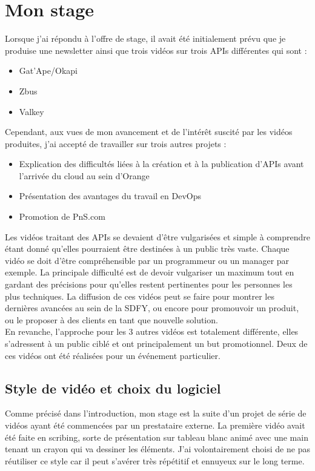\chapter{Mon stage}
\label{sec:unchapitre}

Lorsque j'ai répondu à l'offre de stage, il avait été initialement prévu que je produise une newsletter ainsi que trois vidéos sur trois APIs différentes qui sont :

\begin{itemize}
    \item Gat'Ape/Okapi
    \item Zbus
    \item Valkey
\end{itemize}

Cependant, aux vues de mon avancement et de l'intérêt suscité par les vidéos produites, j'ai accepté de travailler sur trois autres projets :

\begin{itemize}
    \item Explication des difficultés liées à la création et à la publication d'APIs avant l'arrivée du cloud au sein d'Orange
    \item Présentation des avantages du travail en DevOps
    \item Promotion de PnS.com
\end{itemize}



Les vidéos traitant des APIs se devaient d'être vulgarisées et simple à comprendre étant donné qu'elles pourraient être destinées à un public très vaste. Chaque vidéo se doit d'être compréhensible par un programmeur ou un manager par exemple. La principale difficulté est de devoir vulgariser un maximum tout en gardant des précisions pour qu'elles restent pertinentes pour les personnes les plus techniques. La diffusion de ces vidéos peut se faire pour montrer les dernières avancées au sein de la SDFY, ou encore pour promouvoir un produit, ou le proposer à des clients en tant que nouvelle solution. \\

En revanche, l'approche pour les 3 autres vidéos est totalement différente, elles s'adressent à un public ciblé et ont principalement un but promotionnel. Deux de ces vidéos ont été réalisées pour un événement particulier. \\



\section{Style de vidéo et choix du logiciel}
Comme précisé dans l'introduction, mon stage est la suite d'un projet de série de vidéos ayant été commencées par un prestataire externe. La première vidéo avait été faite en scribing, sorte de présentation sur tableau blanc animé avec une main tenant un crayon qui va dessiner les éléments. J'ai volontairement choisi de ne pas réutiliser ce style car il peut s'avérer très répétitif et ennuyeux sur le long terme.


